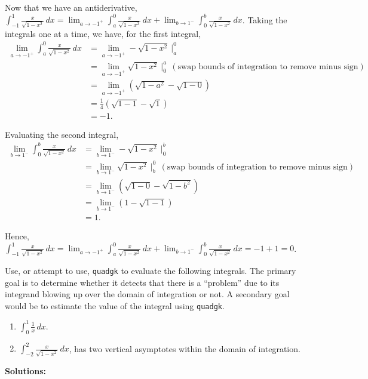 \begin{enumerate}
    Now that we have an antiderivative, $\int_{-1} ^1 \frac{x}{\sqrt{1 - x^2}} \, dx = \displaystyle \lim_{a \to -1^+} \int_a^0  \frac{x}{\sqrt{1 - x^2}} \, dx +  \lim_{b \to 1^-} \int_0^b  \frac{x}{\sqrt{1 - x^2}} \, dx$. Taking the integrals one at a time, we have, for the first integral,
       \begin{align*}
        \lim_{a \to -1^+} \int_a^0  \frac{x}{\sqrt{1 - x^2}} \, dx & = \lim_{a \to -1^+} - \sqrt{1 - x^2}~\bigg|_a^{0} \\[1em]
        &= \lim_{a \to -1^+}  \sqrt{1 - x^2}~\bigg|_{0}^a ~~(\text{swap bounds of integration to remove minus sign}) \\[1em]
        &=  \lim_{a \to -1^+} \left( \sqrt{1 - a^2} - \sqrt{1 - 0}\right) \\[1em]
        &= \frac{1}{4}  \left( \sqrt{1 - 1} - \sqrt{1 }\right) \\[1em]
        & = -1.
    \end{align*}

    Evaluating the second integral,
     \begin{align*}
        \lim_{b \to 1^-} \int_0^b  \frac{x}{\sqrt{1 - x^2}} \, dx & =\lim_{b \to 1^-} - \sqrt{1 - x^2}~\bigg|_0^{b} \\[1em]
        &= \lim_{b \to 1^-}  \sqrt{1 - x^2}~\bigg|_b^0 ~~(\text{swap bounds of integration to remove minus sign}) \\[1em]
        &=  \lim_{b \to 1^-}   \left( \sqrt{1 - 0} - \sqrt{1 - b^2}\right) \\[1em]
        &= \lim_{b \to 1^-} \left( 1 - \sqrt{1 -1}\right) \\[1em]
        & = 1.
    \end{align*}

    Hence, $\int_{-1} ^1 \frac{x}{\sqrt{1 - x^2}} \, dx = \displaystyle \lim_{a \to -1^+} \int_a^0  \frac{x}{\sqrt{1 - x^2}} \, dx +  \lim_{b \to 1^-} \int_0^b  \frac{x}{\sqrt{1 - x^2}} \, dx = -1 + 1 =0$.

\end{enumerate}

\Qed

\bigskip

\begin{example} Use, or attempt to use, \texttt{quadgk} to evaluate the following integrals. The primary goal is to determine whether it detects that there is a ``problem'' due to its integrand blowing up over the domain of integration or not. A secondary goal would be to estimate the value of the integral using \texttt{quadgk}. 
    \begin{enumerate}
\renewcommand{\labelenumi}{(\alph{enumi})}
\setlength{\itemsep}{.2cm}

\item $\int_0 ^1 \frac{1}{x} \, dx$.
 

\item $\int_{-2}^2 \frac{x}{\sqrt{1 - x^2}} \, dx$, has two vertical asymptotes within the domain of integration.

\end{enumerate}
\end{example}
\textbf{Solutions:}

